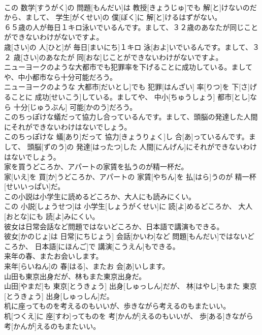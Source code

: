 \documentclass[8pt]{extreport}
\begin{document}
\begin{CJK}{UTF8}{min}
\\	この 数学[すうがく]の 問題[もんだい]は 教授[きょうじゅ]でも 解[と]けないのだから、まして、 学生[がくせい]の 僕[ぼく]に 解[と]けるはずがない。
\\	６５歳の人が毎日１キロ泳いでいるんです。まして、３２歳のあなたが同じことができないわけがないですよ。	
\\	歳[さい]の 人[ひと]が 毎日[まいにち]１キロ 泳[およ]いでいるんです。まして、３２ 歳[さい]のあなたが 同[おな]じことができないわけがないですよ。
\\	ニューヨークのような大都市でも犯罪率を下げることに成功している。ましてや、中小都市なら十分可能だろう。	
\\	ニューヨークのような 大都市[だいとし]でも 犯罪[はんざい] 率[りつ]を 下[さ]げることに 成功[せいこう]している。ましてや、 中小[ちゅうしょう] 都市[とし]なら 十分[じゅうぶん] 可能[かのう]だろう。
\\	このちっぽけな蟻だって協力し合っているんです。まして、頭脳の発達した人間にそれができないわけはないでしょう。	
\\	このちっぽけな 蟻[あり]だって 協力[きょうりょく]し 合[あ]っているんです。まして、 頭脳[ずのう]の 発達[はったつ]した 人間[にんげん]にそれができないわけはないでしょう。
\\	家を買うどころか、アパートの家賃を払うのが精一杯だ。	
\\	家[いえ]を 買[か]うどころか、アパートの 家賃[やちん]を 払[はら]うのが 精一杯[せいいっぱい]だ。
\\	この小説は小学生に読めるどころか、大人にも読みにくい。	
\\	この 小説[しょうせつ]は 小学生[しょうがくせい]に 読[よ]めるどころか、 大人[おとな]にも 読[よ]みにくい。
\\	彼女は日常会話など問題ではないどころか、日本語で講演もできる。	
\\	彼女[かのじょ]は 日常[にちじょう] 会話[かいわ]など 問題[もんだい]ではないどころか、 日本語[にほんご]で 講演[こうえん]もできる。
\\	来年の春、またお会いします。	
\\	来年[らいねん]の 春[はる]、またお 会[あ]いします。
\\	山田も東京出身だが、林もまた東京出身だ。	
\\	山田[やまだ]も 東京[とうきょう] 出身[しゅっしん]だが、 林[はやし]もまた 東京[とうきょう] 出身[しゅっしん]だ。
\\	机に座ってものを考えるのもいいが、歩きながら考えるのもまたいい。	
\\	机[つくえ]に 座[すわ]ってものを 考[かんが]えるのもいいが、 歩[ある]きながら 考[かんが]えるのもまたいい。

\end{CJK}
\end{document}
